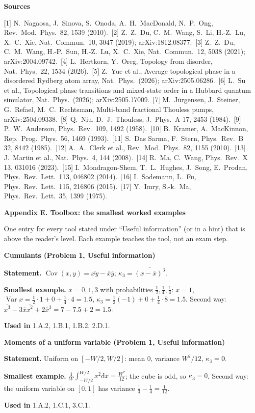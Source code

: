 \documentclass[11pt,a4paper]{article}
\newcommand{\dd}{\mathrm d}
\newcommand{\avg}[1]{\overline{#1}}
\newcommand{\Var}{\operatorname{Var}}
\newcommand{\Cov}{\operatorname{Cov}}
\newcommand{\pagetitle}[1]{{\large\bfseries\color{ink}#1}\par\vspace{4pt}}
\newcommand{\smallheading}[1]{\par\Needspace{6\baselineskip}\medskip\textbf{#1}\par}
\begin{document}
\smallheading{Sources}
{\small
[1] N.~Nagaosa, J.~Sinova, S.~Onoda, A.~H.~MacDonald, N.~P.~Ong, Rev.\ Mod.\ Phys.\ 82, 1539 (2010).\
[2] Z.~Z.~Du, C.~M.~Wang, S.~Li, H.-Z.~Lu, X.~C.~Xie, Nat.\ Commun.\ 10, 3047 (2019); arXiv:1812.08377.\
[3] Z.~Z.~Du, C.~M.~Wang, H.-P.~Sun, H.-Z.~Lu, X.~C.~Xie, Nat.\ Commun.\ 12, 5038 (2021); arXiv:2004.09742.\
[4] L.~Hertkorn, Y.~Oreg, Topology from disorder, Nat.\ Phys.\ 22, 1534 (2026).\
[5] Z.~Yue et al., Average topological phase in a disordered Rydberg atom array, Nat.\ Phys.\ (2026); arXiv:2505.06286.\
[6] L.~Su et al., Topological phase transitions and mixed-state order in a Hubbard quantum simulator, Nat.\ Phys.\ (2026); arXiv:2505.17009.\
[7] M.~J\"urgensen, J.~Steiner, G.~Refael, M.~C.~Rechtsman, Multi-band fractional Thouless pumps, arXiv:2504.09338.\
[8] Q.~Niu, D.~J.~Thouless, J.\ Phys.\ A 17, 2453 (1984).\
[9] P.~W.~Anderson, Phys.\ Rev.\ 109, 1492 (1958).\
[10] B.~Kramer, A.~MacKinnon, Rep.\ Prog.\ Phys.\ 56, 1469 (1993).\
[11] S.~Das Sarma, F.~Stern, Phys.\ Rev.\ B 32, 8442 (1985).\
[12] A.~A.~Clerk et al., Rev.\ Mod.\ Phys.\ 82, 1155 (2010).\
[13] J.~Martin et al., Nat.\ Phys.\ 4, 144 (2008).\
[14] R.~Ma, C.~Wang, Phys.\ Rev.\ X 13, 031016 (2023).\
[15] I.~Mondragon-Shem, T.~L.~Hughes, J.~Song, E.~Prodan, Phys.\ Rev.\ Lett.\ 113, 046802 (2014).\
[16] I.~Sodemann, L.~Fu, Phys.\ Rev.\ Lett.\ 115, 216806 (2015).\
[17] Y.~Imry, S.-k.~Ma, Phys.\ Rev.\ Lett.\ 35, 1399 (1975).
}

\clearpage
\pagetitle{Appendix E. Toolbox: the smallest worked examples}
One entry for every tool stated under ``Useful information'' (or in a hint) that is above the reader's level. Each example teaches the tool, not an exam step.

\smallheading{Cumulants (Problem 1, Useful information)}
\textbf{Statement.} $\Cov(x,y)=\avg{xy}-\avg x\avg y$; $\kappa_3=\avg{(x-\avg x)^3}$.\par
\textbf{Smallest example.} $x=0,1,3$ with probabilities $\frac12,\frac14,\frac14$: $\avg x=1$, $\Var x=\frac12\cdot1+0+\frac14\cdot4=1.5$, $\kappa_3=\frac12(-1)+0+\frac14\cdot8=1.5$. Second way: $\avg{x^3}-3\avg x\avg{x^2}+2\avg x^3=7-7.5+2=1.5$.\par
\textbf{Used in} 1.A.2, 1.B.1, 1.B.2, 2.D.1.

\smallheading{Moments of a uniform variable (Problem 1, Useful information)}
\textbf{Statement.} Uniform on $[-W/2,W/2]$: mean 0, variance $W^2/12$, $\kappa_3=0$.\par
\textbf{Smallest example.} $\frac1W\int_{-W/2}^{W/2}x^2\dd x=\frac{W^2}{12}$; the cube is odd, so $\kappa_3=0$. Second way: the uniform variable on $[0,1]$ has variance $\frac13-\frac14=\frac1{12}$.\par
\textbf{Used in} 1.A.2, 1.C.1, 3.C.1.
\end{document}
